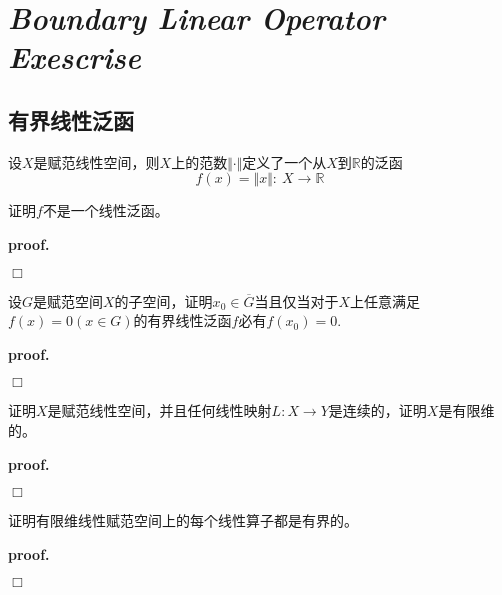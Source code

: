 \chapter{\textsl{Boundary Linear Operator Exescrise} }

\section{有界线性泛函}

\begin{mdframed}
    \begin{question}
        设$X$是赋范线性空间，则$X$上的范数$\Vert \cdot\Vert$定义了一个从$X$到$\mathbb{R}$的泛函
        \begin{equation}
            f(x)=\Vert x\Vert:\ X\rightarrow \mathbb{R}
        \end{equation}

        证明$f$不是一个线性泛函。
    \end{question}
\end{mdframed}

\textbf{proof.}

$\Box$

\begin{mdframed}
    \begin{question}
        设$G$是赋范空间$X$的子空间，证明$x_0\in \overline{G}$当且仅当对于$X$上任意满足$f(x)=0(x\in G)$的有界线性泛函$f$必有$f(x_0)=0$.
    \end{question}
\end{mdframed}

\textbf{proof.}

$\Box$

\begin{mdframed}
    \begin{question}
        证明$X$是赋范线性空间，并且任何线性映射$L:X\rightarrow Y$是连续的，证明$X$是有限维的。
    \end{question}
\end{mdframed}

\textbf{proof.}

$\Box$

\begin{mdframed}
    \begin{question}
        证明有限维线性赋范空间上的每个线性算子都是有界的。
    \end{question}
\end{mdframed}

\textbf{proof.}

$\Box$

